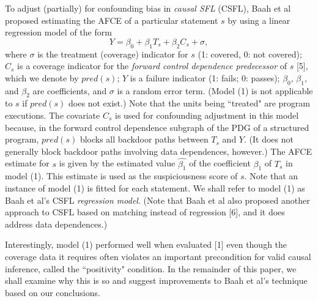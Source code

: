 To adjust (partially) for confounding bias in {\it causal SFL} (CSFL), Baah et al proposed estimating the AFCE of a particular statement $s$ by using a linear regression model of the form
\begin{equation}
Y=\beta_0+\beta_1T_s+\beta_2C_s+\sigma,
\end{equation}
where $\sigma$ is the treatment (coverage) indicator for $s$ (1: covered, 0: not covered); $C_s$ is a coverage indicator for the {\it forward control dependence predecessor} of $s$ [5], which we denote by $pred(s)$; $Y$ is a failure indicator (1: fails; 0: passes); $\beta_0$, $\beta_1$, and $\beta_2$ are coefficients, and $\sigma$ is a random error term.  (Model (1) is not applicable to $s$ if $pred(s)$ does not exist.)  Note that the units being ``treated" are program executions.  The covariate $C_s$ is used for confounding adjustment in this model because, in the forward control dependence subgraph of the PDG of a structured program, $pred(s)$ blocks all backdoor paths between $T_s$ and $Y$.  (It does not generally block backdoor paths involving data dependences, however.)  The AFCE estimate for $s$ is given by the estimated value $\widehat{\beta_1}$ of the coefficient $\beta_1$ of $T_s$ in model (1).  This estimate is used as the suspiciousness score of $s$.  Note that an instance of model (1) is fitted for each statement.  We shall refer to model (1) as Baah et al’s CSFL {\it regression model}.  (Note that Baah et al also proposed another approach to CSFL based on matching instead of regression [6], and it does address data dependences.)

Interestingly, model (1) performed well when evaluated [1] even though the coverage data it requires often violates an important precondition for valid causal inference, called the ``positivity" condition.  In the remainder of this paper, we shall examine why this is so and suggest improvements to Baah et al’s technique based on our conclusions.



